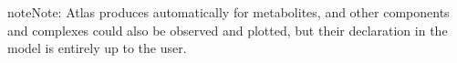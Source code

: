 \documentclass[letterpaper,10pt,english]{sphinxmanual}
\begin{document}
\begin{sphinxadmonition}{note}{Note:}
Atlas produces automatically  for metabolites, and other
components and complexes could also be observed and plotted, but their
declaration in the model is entirely up to the user.
\end{sphinxadmonition}

\begin{sphinxVerbatim}[commandchars=\\\{\},numbers=left,firstnumber=1,stepnumber=1]
           


\end{sphinxVerbatim}
\end{document}
